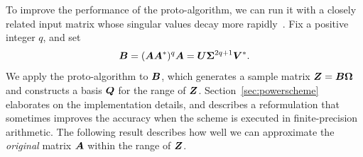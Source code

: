 \documentclass[final]{siamltex}
\newcounter{algorithm}[section]
\begin{document}
To improve the performance of the proto-algorithm, we can
run it with a closely related input matrix whose singular values
decay more rapidly~\cite{Gu-personal,tygert_szlam}.
Fix a positive integer $q$, and set
$$
\bm{B} = (\bm{AA}^*)^{q} \bm{A}
    = \bm{U}\bm{\Sigma}^{2q+1} \bm{V}^*.
$$
We apply the proto-algorithm to $\bm{B}$, which generates a sample
matrix $\bm{Z} = \bm{B\Omega}$ and constructs a basis $\bm{Q}$
for the range of $\bm{Z}$.
Section~\ref{sec:powerscheme} elaborates on the implementation details,
and describes a reformulation that sometimes improves the accuracy when
the scheme is executed in finite-precision arithmetic.
The following result describes how well
we can approximate the \emph{original} matrix $\bm{A}$ within the
range of $\bm{Z}$.


\end{document}
